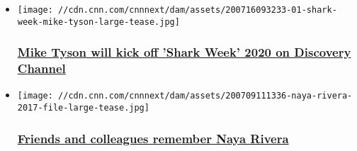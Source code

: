 \begin{itemize}
\item
  \href{/2020/07/16/entertainment/mike-tyson-shark-week/index.html}{}

  \texttt{[image: //cdn.cnn.com/cnnnext/dam/assets/200716093233-01-shark-week-mike-tyson-large-tease.jpg]}

  \hypertarget{mike-tyson-will-kick-off-shark-week-2020-on-discovery-channel}{%
  \subsubsection{\texorpdfstring{\href{/2020/07/16/entertainment/mike-tyson-shark-week/index.html}{Mike
  Tyson will kick off 'Shark Week' 2020 on Discovery
  Channel}}{Mike Tyson will kick off 'Shark Week' 2020 on Discovery Channel}}\label{mike-tyson-will-kick-off-shark-week-2020-on-discovery-channel}}
\item
  \href{/2020/07/13/entertainment/naya-rivera-death-reactions/index.html}{}

  \texttt{[image: //cdn.cnn.com/cnnnext/dam/assets/200709111336-naya-rivera-2017-file-large-tease.jpg]}

  \hypertarget{friends-and-colleagues-remember-naya-rivera}{%
  \subsubsection{\texorpdfstring{\href{/2020/07/13/entertainment/naya-rivera-death-reactions/index.html}{Friends
  and colleagues remember Naya
  Rivera}}{Friends and colleagues remember Naya Rivera}}\label{friends-and-colleagues-remember-naya-rivera}}
\end{itemize}

